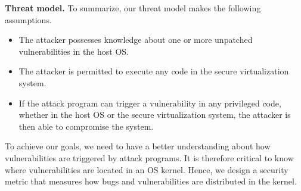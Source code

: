 \noindent\textbf{Threat model.}
To summarize, our threat model makes the following assumptions.

\begin{itemize}\setlength\itemsep{0em}

\item The attacker possesses knowledge about one or more unpatched vulnerabilities in the host OS.

\item The attacker is permitted to execute any code in the secure virtualization system.

\item If the attack program can trigger a vulnerability in any privileged code,
whether in the host OS or the secure virtualization system, the attacker is then able to
compromise the system.

\end{itemize}

To achieve our goals, we need to have a better understanding about how vulnerabilities are
triggered by attack programs. It is therefore critical to know where vulnerabilities are located in
an OS kernel. Hence, we design a security metric that measures how bugs and vulnerabilities
are distributed in the kernel.

